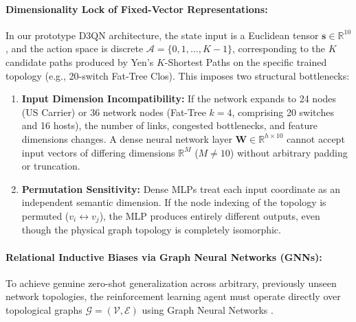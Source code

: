 \documentclass[12pt,a4paper,oneside]{report}
\begin{document}
\paragraph{Dimensionality Lock of Fixed-Vector Representations:}
In our prototype D3QN architecture, the state input is a Euclidean tensor $\mathbf{s} \in \mathbb{R}^{10}$, and the action space is discrete $\mathcal{A} = \{0, 1, \dots, K-1\}$, corresponding to the $K$ candidate paths produced by Yen's $K$-Shortest Paths on the specific trained topology (e.g., 20-switch Fat-Tree Clos).
This imposes two structural bottlenecks:
\begin{enumerate}
    \item \textbf{Input Dimension Incompatibility:} If the network expands to 24 nodes (US Carrier) or 36 network nodes (Fat-Tree $k=4$, comprising 20 switches and 16 hosts), the number of links, congested bottlenecks, and feature dimensions changes. A dense neural network layer $\mathbf{W} \in \mathbb{R}^{h \times 10}$ cannot accept input vectors of differing dimensions $\mathbb{R}^{M}$ ($M \neq 10$) without arbitrary padding or truncation.
    \item \textbf{Permutation Sensitivity:} Dense MLPs treat each input coordinate as an independent semantic dimension. If the node indexing of the topology is permuted ($v_i \leftrightarrow v_j$), the MLP produces entirely different outputs, even though the physical graph topology is completely isomorphic.
\end{enumerate}

\paragraph{Relational Inductive Biases via Graph Neural Networks (GNNs):}
To achieve genuine zero-shot generalization across arbitrary, previously unseen network topologies, the reinforcement learning agent must operate directly over topological graphs $\mathcal{G} = (\mathcal{V}, \mathcal{E})$ using Graph Neural Networks \cite{scarselli2008graph, battaglia2018relational, rusek2019routenet}.
\end{document}
